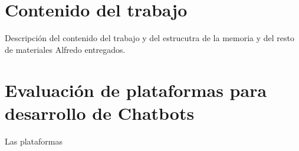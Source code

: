 
\section{Contenido del trabajo}

Descripción del contenido del trabajo y del estrucutra de la memoria y del resto de materiales Alfredo entregados.


\section{Evaluación de plataformas para desarrollo de Chatbots}

Las plataformas